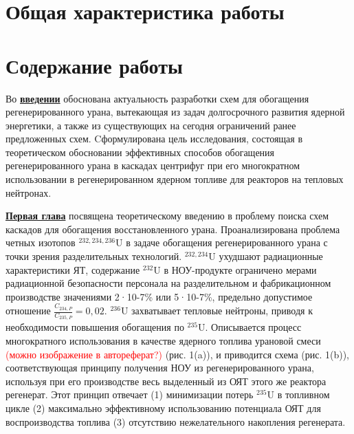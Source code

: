 \section*{Общая характеристика работы}

\newcommand{\actuality}{\underline{\textbf{\actualityTXT}}}
\newcommand{\progress}{\underline{\textbf{\progressTXT}}}
\newcommand{\aim}{\underline{{\textbf\aimTXT}}}
\newcommand{\tasks}{\underline{\textbf{\tasksTXT}}}
\newcommand{\novelty}{\underline{\textbf{\noveltyTXT}}}
\newcommand{\influence}{\underline{\textbf{\influenceTXT}}}
\newcommand{\methods}{\underline{\textbf{\methodsTXT}}}
\newcommand{\defpositions}{\underline{\textbf{\defpositionsTXT}}}
\newcommand{\reliability}{\underline{\textbf{\reliabilityTXT}}}
\newcommand{\probation}{\underline{\textbf{\probationTXT}}}
\newcommand{\contribution}{\underline{\textbf{\contributionTXT}}}
\newcommand{\publications}{\underline{\textbf{\publicationsTXT}}}



\section*{Содержание работы}
Во \underline{\textbf{введении}} обоснована актуальность разработки схем для обогащения регенерированного урана, вытекающая из задач долгосрочного развития ядерной энергетики, а также из существующих на сегодня ограничений ранее предложенных схем. Cформулирована цель исследования, состоящая в теоретическом обосновании эффективных способов обогащения регенерированного урана в каскадах цен­трифуг при его многократном использовании в регенерированном ядерном топливе для реакторов на тепловых нейтронах.

\underline{\textbf{Первая глава}} посвящена теоретическому введению в проблему поиска схем каскадов для обогащения восстановленного урана. Проанализирована проблема четных изотопов $^{232,234,236}$U в задаче обогащения регенерированного урана с точки зрения разделительных технологий. $^{232,234}$U ухудшают радиационные характеристики ЯТ, содержание $^{232}$U в НОУ-продукте ограничено мерами радиационной безопасности персонала на разделительном и фабрикационном производстве значениями 2·10-7\% или 5·10-7\%, предельно допустимое отношение $\frac{C_{234,{P}}}{C_{235,{P}}} = 0,02$. $^{236}$U захватывает тепловые нейтроны, приводя к необходимости повышения обогащения по $^{235}$U. Описывается процесс многократного использования в качестве ядерного топлива урановой смеси \textcolor{red}{(можно изображение в автореферат?)} (рис. 1(a)), и приводится схема (рис. 1(b)), соответствующая принципу получения НОУ из регенерированного урана, используя при его про­изводстве весь выделенный из ОЯТ этого же реактора регенерат. Этот принцип отвечает (1) минимизации потерь  $^{235}$U в топливном цикле (2) максимально эффективному использованию потенциала ОЯТ для воспроизвод­ства топлива (3) отсутствию нежелательного накопления регенерата.

